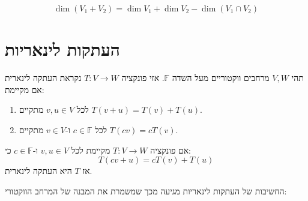 \documentclass{tstextbook}
\begin{document}
\begin{proposition}
$$\dim(V_{1}+V_{2})=\dim V_{1}+\dim V_{2}-\dim(V_{1}\cap V_{2})$$

\end{proposition}
\section{העתקות לינאריות}

\begin{definition}
תהי \(V,W\) מרחבים ווקטוריים מעל השדה \(\mathbb{F}\). אזי פונקציה \(T:V\to W\) נקראת העתקה לינארית אם מקיימת:

  \begin{enumerate}
    \item לכל \(v, u \in V\) מתקיים \(T(v+u)=T(v)+T(u)\). 


    \item לכל \(c \in \mathbb{F}\) ו-\(v \in V\) מתקיים \(T(cv)=cT(v)\). 


  \end{enumerate}
\end{definition}
\begin{proposition}
אם פונקציה \(T:V\to W\) מקיימת לכל \(v,u \in V\) ו-\(c \in \mathbb{F}\) כי:
$$T(cv+u)=cT(v)+T(u)$$
אז \(T\) היא העתקה לינארית.

\end{proposition}
החשיבות של העתקות לינאריות מגיעה מכך שמשמרת את המבנה של המרחב הווקטורי:
\end{document}
